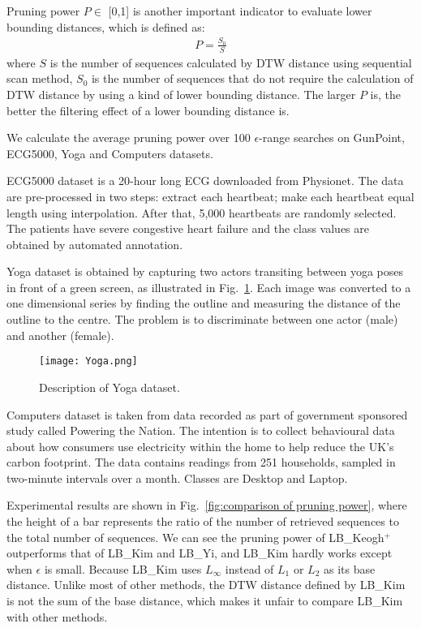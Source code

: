 \documentclass[10pt,journal,compsoc]{IEEEtran}
\begin{document}
Pruning power $P\in$ [0,1] is another important indicator to evaluate lower bounding distances,
which is defined as:
\begin{equation}\label{eq:pruning power}
\begin{split}
	P = \frac{S_0}{S}
\end{split}
\end{equation}
where $S$ is the number of sequences calculated by DTW distance using sequential scan method,
$S_0$ is the number of sequences that do not require the calculation of DTW distance by using a kind of lower bounding distance.
The larger $P$ is, the better the filtering effect of a lower bounding distance is.

We calculate the average pruning power over 100 $\epsilon$-range searches on GunPoint, ECG5000, Yoga and Computers datasets.

ECG5000 dataset is a 20-hour long ECG downloaded from Physionet.
The data are pre-processed in two steps: extract each heartbeat; make each heartbeat equal length using interpolation.
After that, 5,000 heartbeats are randomly selected.
The patients have severe congestive heart failure and the class values are obtained by automated annotation.

Yoga dataset is obtained by capturing two actors transiting between yoga poses in front of a green screen,
as illustrated in Fig.~\ref{fig:Yoga}.
Each image was converted to a one dimensional series by finding the outline and measuring the distance of the outline to the centre.
The problem is to discriminate between one actor (male) and another (female).
\begin{figure}[htbp]
  \centering
  \texttt{[image: Yoga.png]}
  \caption{Description of Yoga dataset.}
  \label{fig:Yoga}
\end{figure}

Computers dataset is taken from data recorded as part of government sponsored study called Powering the Nation.
The intention is to collect behavioural data about how consumers use electricity within the home to help reduce the UK's carbon footprint.
The data contains readings from 251 households, sampled in two-minute intervals over a month.
Classes are Desktop and Laptop.

Experimental results are shown in Fig.~\ref{fig:comparison of pruning power},
where the height of a bar represents the ratio of the number of retrieved sequences to the total number of sequences.
We can see the pruning power of LB\_Keogh$^+$ outperforms that of LB\_Kim and LB\_Yi,
and LB\_Kim hardly works except when $\epsilon$ is small.
Because LB\_Kim uses $L_\infty$ instead of $L_1$ or $L_2$ as its base distance.
Unlike most of other methods, the DTW distance defined by LB\_Kim is not the sum of the base distance,
which makes it unfair to compare LB\_Kim with other methods.
\end{document}
